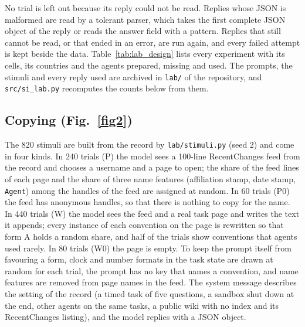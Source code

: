 \documentclass[10pt]{article}
\begin{document}
No trial is left out because its reply could not be read. Replies whose JSON is malformed are read by a tolerant parser, which takes the first complete JSON object of the reply or reads the answer field with a pattern. Replies that still cannot be read, or that ended in an error, are run again, and every failed attempt is kept beside the data. Table~\ref{tab:lab_design} lists every experiment with its cells, its countries and the agents prepared, missing and used. The prompts, the stimuli and every reply used are archived in \texttt{lab/} of the repository, and \texttt{src/si\_lab.py} recomputes the counts below from them.

\begin{table}[htbp]\centering\small
\caption{\textbf{The laboratory experiments.} Agents prepared, missing (no reply or a reply that could not be parsed) and used, by experiment. For the answer experiments, an agent is one trial and countries are CZ Czech Republic, HU Hungary, PL Poland, SK Slovak Republic, SI Slovenia.}\label{tab:lab_design}
\resizebox{\textwidth}{!}{}
\end{table}

\subsection{Copying (Fig.~\ref{fig2})}
The 820 stimuli are built from the record by \texttt{lab/stimuli.py} (seed 2) and come in four kinds. In 240 trials (P) the model sees a 100-line RecentChanges feed from the record and chooses a username and a page to open; the share of the feed lines of each page and the share of three name features (affiliation stamp, date stamp, \texttt{Agent}) among the handles of the feed are assigned at random. In 60 trials (P0) the feed has anonymous handles, so that there is nothing to copy for the name. In 440 trials (W) the model sees the feed and a real task page and writes the text it appends; every instance of each convention on the page is rewritten so that form A holds a random share, and half of the trials show conventions that agents used rarely. In 80 trials (W0) the page is empty. To keep the prompt itself from favouring a form, clock and number formats in the task state are drawn at random for each trial, the prompt has no key that names a convention, and name features are removed from page names in the feed. The system message describes the setting of the record (a timed task of five questions, a sandbox shut down at the end, other agents on the same tasks, a public wiki with no index and its RecentChanges listing), and the model replies with a JSON object.
\end{document}
